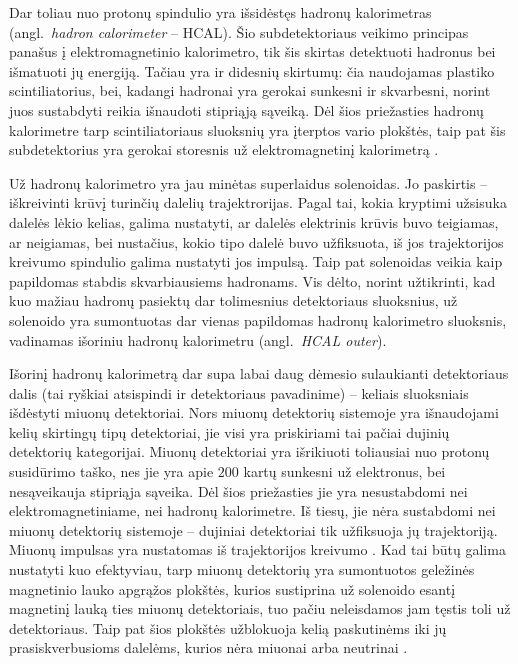 \documentclass[a4paper, 12pt]{article}
\begin{document}
Dar toliau nuo protonų spindulio yra išsidėstęs hadronų kalorimetras (angl.\ \textit{hadron calorimeter} -- HCAL).
Šio subdetektoriaus veikimo principas panašus į elektromagnetinio kalorimetro, tik šis skirtas detektuoti
hadronus bei išmatuoti jų energiją.
Tačiau yra ir didesnių skirtumų: čia naudojamas plastiko scintiliatorius, bei, kadangi hadronai yra gerokai
sunkesni ir skvarbesni, norint juos sustabdyti reikia išnaudoti stipriąją sąveiką.
Dėl šios priežasties hadronų kalorimetre tarp scintiliatoriaus sluoksnių yra įterptos vario plokštės, taip
pat šis subdetektorius yra gerokai storesnis už elektromagnetinį kalorimetrą \cite{Hcal}.

Už hadronų kalorimetro yra jau minėtas superlaidus solenoidas.
Jo paskirtis -- iškreivinti krūvį turinčių dalelių trajektrorijas.
Pagal tai, kokia kryptimi užsisuka dalelės lėkio kelias, galima nustatyti, ar dalelės elektrinis krūvis buvo
teigiamas, ar neigiamas, bei nustačius, kokio tipo dalelė buvo užfiksuota, iš jos trajektorijos kreivumo
spindulio galima nustatyti jos impulsą.
Taip pat solenoidas veikia kaip papildomas stabdis skvarbiausiems hadronams.
Vis dėlto, norint užtikrinti, kad kuo mažiau hadronų pasiektų dar tolimesnius detektoriaus sluoksnius, už
solenoido yra sumontuotas dar vienas papildomas hadronų kalorimetro sluoksnis, vadinamas išoriniu hadronų
kalorimetru (angl.\ \textit{HCAL outer}).

Išorinį hadronų kalorimetrą dar supa labai daug dėmesio sulaukianti detektoriaus dalis (tai ryškiai atsispindi
ir detektoriaus pavadinime) -- keliais sluoksniais išdėstyti miuonų detektoriai.
Nors miuonų detektorių sistemoje yra išnaudojami kelių skirtingų tipų detektoriai, jie visi yra priskiriami
tai pačiai dujinių detektorių kategorijai.
Miuonų detektoriai yra išrikiuoti toliausiai nuo protonų susidūrimo taško, nes jie yra apie $200$ kartų
sunkesni už elektronus, bei nesąveikauja stipriąja sąveika.
Dėl šios priežasties jie yra nesustabdomi nei elektromagnetiniame, nei hadronų kalorimetre.
Iš tiesų, jie nėra sustabdomi nei miuonų detektorių sistemoje -- dujiniai detektoriai tik užfiksuoja jų
trajektoriją.
Miuonų impulsas yra nustatomas iš trajektorijos kreivumo \cite{MuonChambers}.
Kad tai būtų galima nustatyti kuo efektyviau, tarp miuonų detektorių yra sumontuotos geležinės magnetinio
lauko apgrąžos plokštės, kurios sustiprina už solenoido esantį magnetinį lauką ties miuonų detektoriais,
tuo pačiu neleisdamos jam tęstis toli už detektoriaus.
Taip pat šios plokštės užblokuoja kelią paskutinėms iki jų prasiskverbusioms dalelėms, kurios nėra miuonai
arba neutrinai \cite{Solenoid}.
\end{document}
